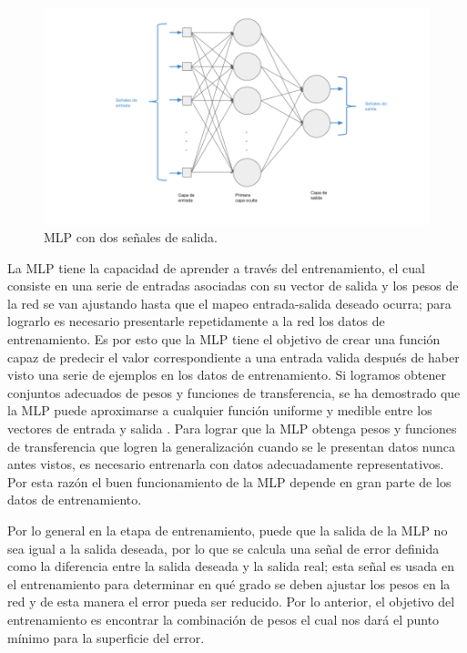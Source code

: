 \begin{onehalfspacing}
\begin{figure}[th]
	\centering
	\includegraphics[width=14cm,keepaspectratio]{XX_Figures/fig2_MLP.png}
	\caption{\footnotesize MLP con dos señales de salida.}
	\label{fig:fig2_MLP}
\end{figure}

La MLP tiene la capacidad de aprender a través del entrenamiento, el cual consiste en una serie de entradas asociadas con su vector de salida y los pesos de la red se van ajustando hasta que el mapeo entrada-salida deseado ocurra; para lograrlo es necesario presentarle repetidamente a la red los datos de entrenamiento. Es por esto que la MLP tiene el objetivo de crear una función capaz de predecir el valor correspondiente a una entrada valida después de haber visto una serie de ejemplos en los datos de entrenamiento. Si logramos obtener conjuntos adecuados de pesos y funciones de transferencia, se ha demostrado que la MLP puede aproximarse a cualquier función uniforme y medible entre los vectores de entrada y salida \cite{Caille1980EtudeThymie}. Para lograr que la MLP obtenga pesos y funciones de transferencia que logren la generalización cuando se le presentan datos nunca antes vistos, es necesario entrenarla con datos adecuadamente representativos. Por esta razón el buen funcionamiento de la MLP depende en gran parte de los datos de entrenamiento. 

Por lo general en la etapa de entrenamiento, puede que la salida de la MLP no sea igual a la salida deseada, por lo que se calcula una señal de error definida como la diferencia entre la salida deseada y la salida real; esta señal es usada en el entrenamiento para determinar en qué grado se deben ajustar los pesos en la red y de esta manera el error pueda ser reducido. Por lo anterior, el objetivo del entrenamiento es encontrar la combinación de pesos el cual nos dará el punto mínimo para la superficie del error. 


\end{onehalfspacing}
